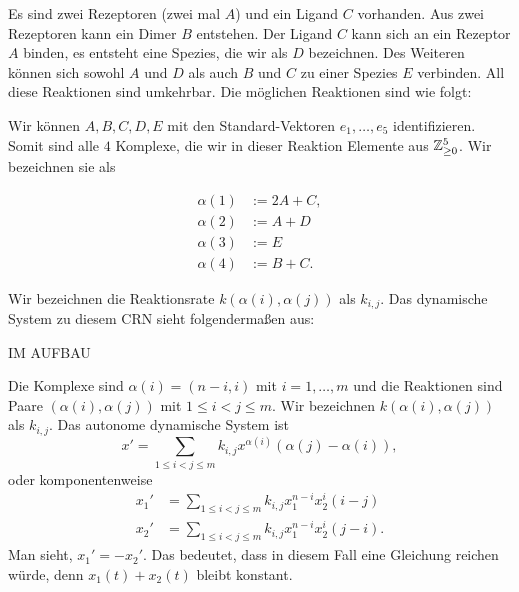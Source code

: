 \documentclass[11pt]{article}
\numberwithin{equation}{section}
\begin{document}
\begin{beispiel} 

Es sind zwei Rezeptoren (zwei mal $A$) und ein Ligand $C$ vorhanden. Aus zwei Rezeptoren kann ein Dimer $B$ entstehen. Der Ligand $C$ kann sich an ein Rezeptor $A$ binden, es entsteht  eine Spezies, die wir als $D$ bezeichnen. Des Weiteren können sich sowohl $A$ und $D$ als auch $B$ und $C$ zu einer Spezies $E$ verbinden. All diese Reaktionen sind umkehrbar. Die möglichen Reaktionen sind wie folgt: 

\begin{center} 
\end{center} 

Wir können $A,B,C,D,E$ mit den Standard-Vektoren $e_1,\ldots,e_5 $ identifizieren. Somit sind alle $4$ Komplexe, die wir in dieser Reaktion Elemente aus $\mathbb{Z}_{\ge 0}^5$. Wir bezeichnen sie als 

\begin{align*}
		\alpha(1) & := 2 A + C,
	\\	\alpha(2) & := A +D 
	\\	\alpha(3) &:= E
	\\	\alpha(4) &:= B +C. 
\end{align*}

Wir bezeichnen die Reaktionsrate $k(\alpha(i),\alpha(j))$ als $k_{i,j}$. Das dynamische System zu diesem CRN sieht folgendermaßen aus: 
\begin{center}
IM AUFBAU 
\end{center}
\end{beispiel} 

\begin{beispiel} 
	Die Komplexe sind $\alpha(i) = (n-i,i)$ mit $i=1,\ldots,m$ und die Reaktionen sind Paare $(\alpha(i),\alpha(j))$ mit $1 \le i < j \le m$. Wir bezeichnen $k(\alpha(i),\alpha(j))$ als $k_{i,j}$. Das autonome dynamische System ist 
	\[
			x' = \sum_{1 \le i < j \le m} k_{i,j} x^{\alpha(i)} (\alpha(j) - \alpha(i)), 
	\]
	oder komponentenweise 
	\begin{align*}
			x_1' & = \sum_{1 \le i < j \le m} k_{i,j} x_1^{n-i} x_2^i (i-j)
			\\ x_2' & = \sum_{1 \le i < j \le m} k_{i,j} x_1^{n-i} x_2^i (j-i). 
	\end{align*}
	Man sieht, $x_1' = -x_2'$. Das bedeutet, dass in diesem Fall eine Gleichung reichen würde, denn $x_1(t) + x_2(t)$ bleibt konstant. 
\end{beispiel} 
\end{document}
